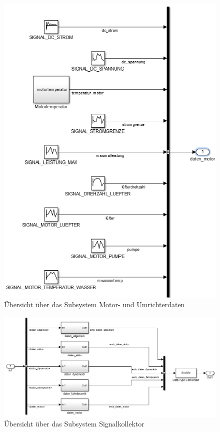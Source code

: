 \documentclass[fontsize = 12pt, paper = a4]{scrreprt}
\begin{document}
\begin{figure}[h]
\centering
\includegraphics[scale = 1]{submotordaten}
\caption[Subsystem Motor- und Umrichterdaten]{Übersicht über das Subsystem Motor- und Umrichterdaten}
\label{submotordaten}
\end{figure} 

\newpage

\begin{figure}
\centering
\includegraphics[scale = 0.85]{subsignalkollektor}
\caption[Übersicht über das Subsystem Signalkollektor]{Übersicht über das Subsystem Signalkollektor}
\label{subsignalkollektor}
\end{figure}
\end{document}
